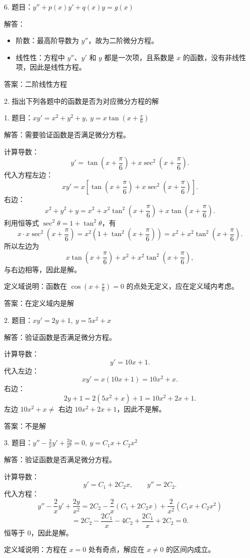 6. 题目：\(y''+p(x)y'+q(x)y=g(x)\)

解答：
\begin{itemize}
\item 阶数：最高阶导数为 \(y''\)，故为二阶微分方程。
\item 线性性：方程中 \(y''\)、\(y'\) 和 \(y\) 都是一次项，且系数是 \(x\) 的函数，没有非线性项，因此是线性方程。
\end{itemize}
答案：二阶线性方程

2. 指出下列各题中的函数是否为对应微分方程的解

1. 题目：\(xy'=x^{2}+y^{2}+y,\ y=x\tan\left(x+\frac{\pi}{6}\right)\)

解答：需要验证函数是否满足微分方程。

计算导数：
\[ y'=\tan\left(x+\frac{\pi}{6}\right)+x\sec^{2}\left(x+\frac{\pi}{6}\right). \]
代入方程左边：
\[ xy'=x\left[\tan\left(x+\frac{\pi}{6}\right)+x\sec^{2}\left(x+\frac{\pi}{6}\right)\right]. \]
右边：
\[ x^{2}+y^{2}+y=x^{2}+x^{2}\tan^{2}\left(x+\frac{\pi}{6}\right)+x\tan\left(x+\frac{\pi}{6}\right). \]
利用恒等式 \(\sec^{2}\theta=1+\tan^{2}\theta\)，有
\[ x\cdot x\sec^{2}\left(x+\frac{\pi}{6}\right)=x^{2}\left(1+\tan^{2}\left(x+\frac{\pi}{6}\right)\right)=x^{2}+x^{2}\tan^{2}\left(x+\frac{\pi}{6}\right). \]
所以左边为
\[ x\tan\left(x+\frac{\pi}{6}\right)+x^{2}+x^{2}\tan^{2}\left(x+\frac{\pi}{6}\right), \]
与右边相等，因此是解。

定义域说明：函数在 \(\cos\left(x+\frac{\pi}{6}\right)=0\) 的点处无定义，应在定义域内考虑。

答案：在定义域内是解

2. 题目：\(xy'=2y+1,\ y=5x^{2}+x\)

解答：验证函数是否满足微分方程。

计算导数：
\[ y'=10x+1. \]
代入左边：
\[ xy'=x(10x+1)=10x^{2}+x. \]
右边：
\[ 2y+1=2(5x^{2}+x)+1=10x^{2}+2x+1. \]
左边 \(10x^{2}+x\ne\) 右边 \(10x^{2}+2x+1\)，因此不是解。

答案：不是解

3. 题目：\(y''-\frac{2}{x}y'+\frac{2y}{x^{2}}=0,\ y=C_{1}x+C_{2}x^{2}\)

解答：验证函数是否满足微分方程。

计算导数：
\[ y'=C_{1}+2C_{2}x,\qquad y''=2C_{2}. \]
代入方程：
\[ y''-\frac{2}{x}y'+\frac{2y}{x^{2}}=2C_{2}-\frac{2}{x}(C_{1}+2C_{2}x)+\frac{2}{x^{2}}(C_{1}x+C_{2}x^{2}) \]
\[ =2C_{2}-\frac{2C_{1}}{x}-4C_{2}+\frac{2C_{1}}{x}+2C_{2}=0. \]
恒等于 \(0\)，因此是解。

定义域说明：方程在 \(x=0\) 处有奇点，解应在 \(x\ne0\) 的区间内成立。

